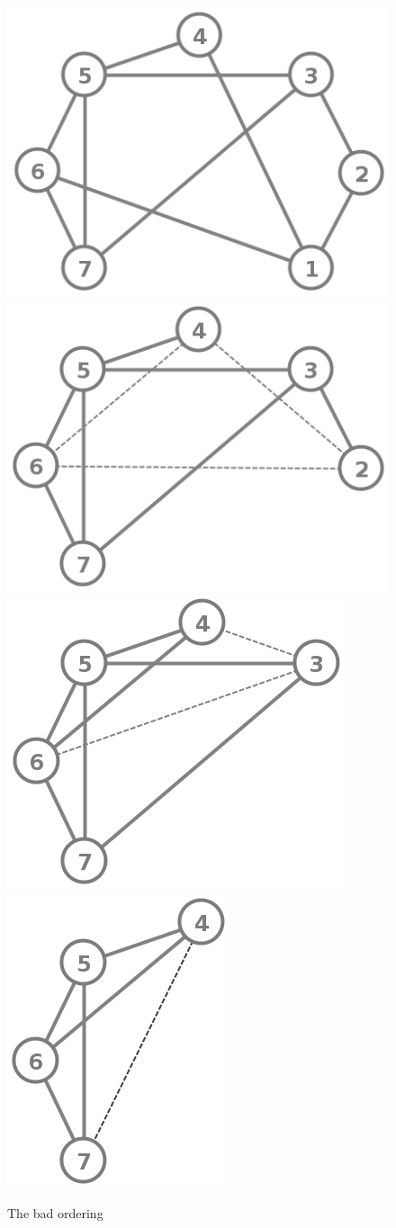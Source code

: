 \documentclass[12pt, oneside]{book}
\begin{document}
\begin{figure}
\centering
   \includegraphics[width=0.4\linewidth]{bad_order}
   \hfill
   \includegraphics[width=0.4\linewidth]{bad_order_1_removed}
   \includegraphics[width=0.4\linewidth]{bad_order_2_1_removed}
   \hfill
   \includegraphics[width=0.3\linewidth]{bad_order_3_2_1_removed}
\caption{The bad  ordering}
\label{bad_order_fillin}
\end{figure}
\end{document}
